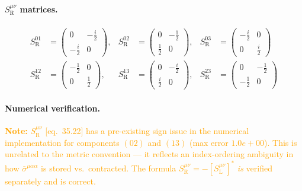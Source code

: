 \paragraph{\texorpdfstring{$S^{\mu\nu}_{\mathrm{R}}$}{SR} matrices.}
\begin{align*}
  S^{01}_{\mathrm{R}} &= \begin{pmatrix}0 & -\tfrac{i}{2} \\ -\tfrac{i}{2} & 0\end{pmatrix},&
  S^{02}_{\mathrm{R}} &= \begin{pmatrix}0 & -\tfrac{1}{2} \\ \tfrac{1}{2} & 0\end{pmatrix},&
  S^{03}_{\mathrm{R}} &= \begin{pmatrix}-\tfrac{i}{2} & 0 \\ 0 & \tfrac{i}{2}\end{pmatrix}\\[6pt]
  S^{12}_{\mathrm{R}} &= \begin{pmatrix}-\tfrac{1}{2} & 0 \\ 0 & \tfrac{1}{2}\end{pmatrix},&
  S^{13}_{\mathrm{R}} &= \begin{pmatrix}0 & -\tfrac{i}{2} \\ \tfrac{i}{2} & 0\end{pmatrix},&
  S^{23}_{\mathrm{R}} &= \begin{pmatrix}0 & -\tfrac{1}{2} \\ -\tfrac{1}{2} & 0\end{pmatrix}
\end{align*}

\paragraph{Numerical verification.}

\textcolor{orange}{\textbf{Note:} $S^{\mu\nu}_{\mathrm{R}}$ [eq.~35.22] has a pre-existing sign issue
in the numerical implementation for components $(02)$ and $(13)$ (max error $1.0e+00$).
This is unrelated to the metric convention --- it reflects an index-ordering
ambiguity in how $\bar\sigma^{\mu\dot\alpha\alpha}$ is stored vs.\ contracted.
The formula $S^{\mu\nu}_{\mathrm{R}} = -[S^{\mu\nu}_{\mathrm{L}}]^*$
\emph{is} verified separately and is correct.}

